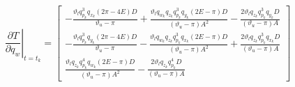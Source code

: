 \documentclass{article}
\begin{document}
		\[
			\left .\displaystyle \frac{\partial T}{\partial q_w}\right |_{t=t_k}  = 
										\begin{bmatrix}
											-\displaystyle \frac{\vartheta_l q_{p_k}^3 q_{x_k} \left (2\pi-4 E \right) D}{\vartheta_u - \pi } + \displaystyle \frac{\vartheta_l q_{w_k} q_{z_k} q_{p_k}^3 q_{y_k} \left (2 E-\pi \right ) D}{\left (\vartheta_u - \pi \right )A^2} - \displaystyle \frac{2 \vartheta_l q_{z_k} q_{p_k}^3 q_{y_k} D}{\left(\vartheta_u - \pi \right )A}\\
											-\displaystyle \frac{\vartheta_l q_{p_k}^3 q_{y_k} \left (2\pi-4 E \right) D}{\vartheta_u - \pi} - \displaystyle \frac{\vartheta_l q_{w_k} q_{z_k} q_{p_k}^3 q_{x_k} \left (2 E-\pi \right ) D}{\left (\vartheta_u - \pi \right )A^2} + \displaystyle \frac{2 \vartheta_l q_{z_k} q_{p_k}^3 q_{x_k} D}{\left(\vartheta_u - \pi \right )A}\\
											\displaystyle \frac{\vartheta_l q_{z_k} q_{p_k}^4 q_{w_k} \left (2 E-\pi \right ) D}{\left(\vartheta_u-\pi \right)A^2} - \displaystyle \frac{2 \vartheta_l q_{z_k} q_{p_k}^4 D}{\left ( \vartheta_u - \pi \right )A}
										\end{bmatrix} 
		\]
\end{document}
